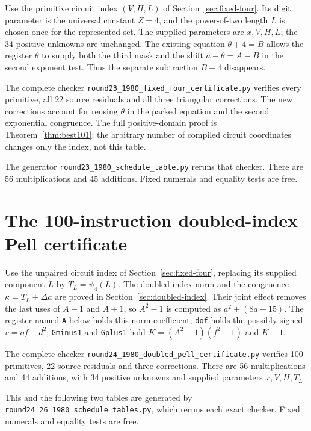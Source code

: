 \documentclass[11pt,letterpaper]{article}
\theoremstyle{definition}
\theoremstyle{remark}
\numberwithin{equation}{section}
\newcommand{\file}[1]{\texttt{#1}}
\begin{document}
Use the primitive circuit index $(V,H,L)$ of Section~\ref{sec:fixed-four}.
Its digit parameter is the universal constant $Z=4$, and the power-of-two
length $L$ is chosen once for the represented set. The supplied parameters
are $x,V,H,L$; the 34 positive unknowns are unchanged. The existing
equation $\theta+4=B$ allows the register $\theta$ to supply both the
third mask and the shift $a-\theta=A-B$ in the second exponent test.
Thus the separate subtraction $B-4$ disappears.

The complete checker \file{round23\_1980\_fixed\_four\_certificate.py}
verifies every primitive, all 22 source residuals and all three triangular
corrections. The new corrections account for reusing $\theta$ in the
packed equation and the second exponential congruence. The full
positive-domain proof is Theorem~\ref{thm:best101}; the arbitrary number
of compiled circuit coordinates changes only the index, not this table.

The generator \file{round23\_1980\_schedule\_table.py} reruns that checker.
There are 56 multiplications and 45 additions. Fixed numerals and
equality tests are free.

\small


\clearpage\normalsize
\section{The 100-instruction doubled-index Pell certificate}\label{app:100-pell}

Use the unpaired circuit index of Section~\ref{sec:fixed-four}, replacing
its supplied component $L$ by $T_L=\psi_4(L)$. The doubled-index norm
and the congruence $\kappa=T_L+\Delta a$ are proved in
Section~\ref{sec:doubled-index}. Their joint effect removes the last
uses of $A-1$ and $A+1$, so $A^2-1$ is computed as $a^2+(8a+15)$.
The register named \texttt{A} below holds this norm coefficient;
\texttt{dof} holds the possibly signed $v=of-d^2$;
\texttt{Gminus1} and \texttt{Gplus1} hold $K=(A^2-1)(f^2-1)$ and $K-1$.

The complete checker \file{round24\_1980\_doubled\_pell\_certificate.py}
verifies 100 primitives, 22 source residuals and three corrections.
There are 56 multiplications and 44 additions, with 34 positive unknowns
and supplied parameters $x,V,H,T_L$.

This and the following two tables are generated by
\file{round24\_26\_1980\_schedule\_tables.py}, which reruns each exact
checker. Fixed numerals and equality tests are free.
\end{document}
